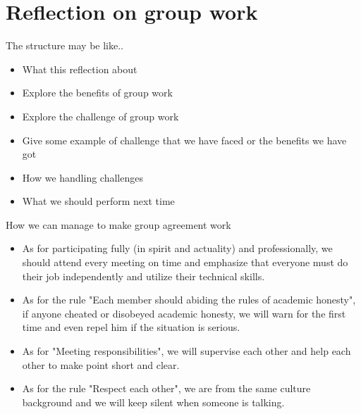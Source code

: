 \newpage
\section{Reflection on group work}
The structure may be like..
\begin{itemize}
    \item What this reflection about
    \item Explore the benefits of group work
    \item Explore the challenge of group work
    \item Give some example of challenge that we have faced or the benefits we have got
    \item How we handling challenges
    \item What we should perform next time
\end{itemize}
How we can manage to make group agreement work
\begin{itemize}
    \item As for participating fully (in spirit and actuality) and professionally, we should attend every meeting on time and emphasize that everyone must do their job independently and utilize their technical skills.
    \item As for the rule "Each member should abiding the rules of academic honesty", if anyone cheated or disobeyed academic honesty, we will warn for the first time and even repel him if the situation is serious.
    \item As for "Meeting responsibilities", we will supervise each other and help each other to make point short and clear.
    \item As for the rule "Respect each other", we are from the same culture background and we will keep silent when someone is talking.

\end{itemize}